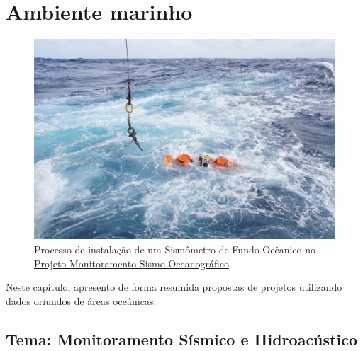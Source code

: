 \documentclass[10pt,a4paper,oneside]{book}
\newcommand{\HeroFigPad}{\vspace{-1cm}}
\begin{document}

\chapter{Ambiente marinho}
\label{cap_mar}

\begin{figure}[h]
	\HeroFigPad
	\begin{center}
		\includegraphics[width=\textwidth]{images/obs_foto.jpeg}
	\end{center}
	\caption{
	Processo de instalação de um Sismômetro de Fundo Ocêanico no \href{https://sismo-oceano.ufsc.br/}{Projeto Monitoramento Sismo-Oceanográfico}.
    }
 \label{fig_obs}
\end{figure}

Neste capítulo, apresento de forma resumida propostas de projetos utilizando dados oriundos de áreas oceânicas.   

\section{Tema: Monitoramento Sísmico e Hidroacústico}
\end{document}
